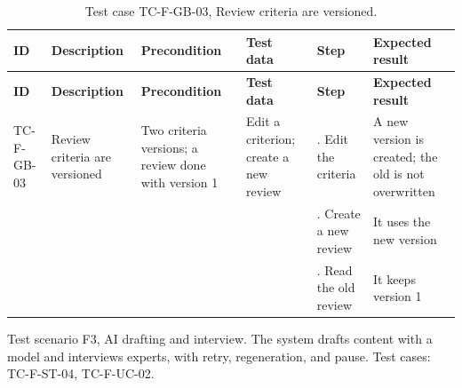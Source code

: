{\footnotesize{}\renewcommand{\arraystretch}{1.1}
\begin{longtable}{|>{\raggedright\arraybackslash}p{}|>{\raggedright\arraybackslash}p{}|>{\raggedright\arraybackslash}p{}|>{\raggedright\arraybackslash}p{}|>{\raggedright\arraybackslash}p{}|>{\raggedright\arraybackslash}p{}|}
\caption{Test case TC-F-GB-03, Review criteria are versioned.} \\
\hline
\textbf{ID} & \textbf{Description} & \textbf{Precondition} & \textbf{Test data} & \textbf{Step} & \textbf{Expected result} \\ \hline
\endfirsthead
\hline
\textbf{ID} & \textbf{Description} & \textbf{Precondition} & \textbf{Test data} & \textbf{Step} & \textbf{Expected result} \\ \hline
\endhead
TC-F-GB-03 & Review criteria are versioned & Two criteria versions; a review done with version 1 & Edit a criterion; create a new review & 1. Edit the criteria & A new version is created; the old is not overwritten \\ \cline{5-6}
 &  &  &  & 2. Create a new review & It uses the new version \\ \cline{5-6}
 &  &  &  & 3. Read the old review & It keeps version 1 \\ \hline
\end{longtable}
}

Test scenario F3, AI drafting and interview. The system drafts content with a model and interviews experts, with retry, regeneration, and pause. Test cases: TC-F-ST-04, TC-F-UC-02.

